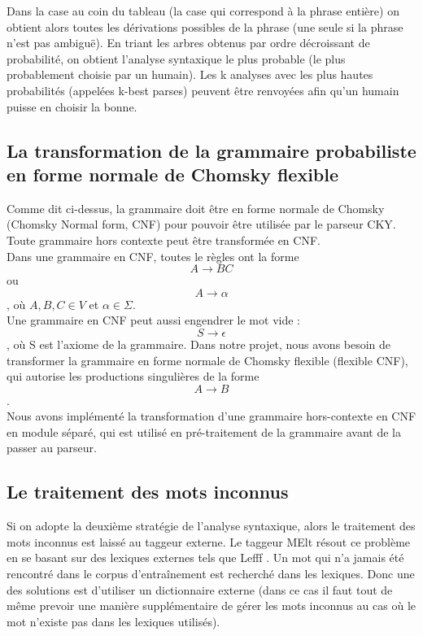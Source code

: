 \documentclass[12pt]{article}
\begin{document}
Dans la case au coin du tableau (la case qui correspond à la phrase entière) on
obtient alors toutes les dérivations possibles de la phrase (une seule si la
phrase n'est pas ambiguë). En triant les arbres obtenus par ordre décroissant de
probabilité, on obtient l'analyse syntaxique le plus probable (le plus
probablement choisie par un humain). Les k analyses avec les plus hautes
probabilités (appelées k-best parses) peuvent être renvoyées afin qu'un humain
puisse en choisir la bonne.


\subsection{La transformation de la grammaire probabiliste en forme normale de Chomsky flexible}

Comme dit ci-dessus, la grammaire doit être en forme normale de Chomsky
(Chomsky Normal form, CNF) pour pouvoir être utilisée par le parseur CKY. Toute
grammaire hors contexte peut être transformée en CNF. \\

Dans une grammaire en
CNF, toutes le règles ont la forme $$A \rightarrow BC$$ ou $$A \rightarrow
\alpha$$, où $A,B,C \in V$ et $\alpha \in \Sigma$. \\

Une grammaire en CNF peut
aussi engendrer le mot vide : $$S \rightarrow \epsilon$$, où S est l'axiome de
la grammaire.
Dans notre projet, nous avons besoin de transformer la grammaire en forme
normale de Chomsky flexible (flexible CNF), qui autorise les productions
singulières de la forme $$A \rightarrow B$$. \\

Nous avons implémenté la transformation d'une grammaire hors-contexte en CNF en
module séparé, qui est utilisé en pré-traitement de la grammaire avant
de la passer au parseur. 

\subsection{Le traitement des mots inconnus}

Si on adopte la deuxième stratégie de l'analyse syntaxique, alors le
traitement des mots inconnus est laissé au taggeur externe.
Le taggeur MElt résout ce problème en se basant sur des lexiques externes tels
que Lefff \cite{Lefff}. Un mot qui n'a jamais été rencontré dans le corpus
d'entraînement est recherché dans les lexiques. Donc une des solutions est
d'utiliser un dictionnaire externe (dans ce cas il faut tout de même prevoir
une manière supplémentaire de gérer les mots inconnus au cas où le mot n'existe
pas dans les lexiques utilisés).\\
\end{document}
